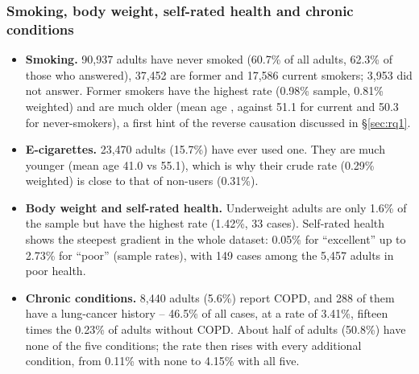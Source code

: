 \subsubsection{Smoking, body weight, self-rated health and chronic conditions}\label{sec:smokingprofile}

\begin{table}[htbp]
\centering\footnotesize
\caption{Smoking, e-cigarette use, body weight and self-rated health (same columns as Table~\ref{tab:prof-demo}).}\label{tab:prof-smoking}

\end{table}

\begin{table}[htbp]
\centering\footnotesize
\caption{Chronic conditions (ever told by a doctor) and the number of the five conditions (same columns as Table~\ref{tab:prof-demo}).}\label{tab:prof-conditions}

\end{table}

\begin{itemize}
  \item \textbf{Smoking.} 90,937 adults have never smoked (60.7\% of all adults, 62.3\% of those who answered), 37,452 are former and 17,586 current smokers; 3,953 did not answer. Former smokers have the highest rate (0.98\% sample, 0.81\% weighted) and are much older (mean age \formerSmokerAge, against 51.1 for current and 50.3 for never-smokers), a first hint of the reverse causation discussed in \S\ref{sec:rq1}.
  \item \textbf{E-cigarettes.} 23,470 adults (15.7\%) have ever used one. They are much younger (mean age 41.0 vs 55.1), which is why their crude rate (0.29\% weighted) is close to that of non-users (0.31\%).
  \item \textbf{Body weight and self-rated health.} Underweight adults are only 1.6\% of the sample but have the highest rate (1.42\%, 33 cases). Self-rated health shows the steepest gradient in the whole dataset: 0.05\% for ``excellent'' up to 2.73\% for ``poor'' (sample rates), with 149 cases among the 5,457 adults in poor health.
  \item \textbf{Chronic conditions.} 8,440 adults (5.6\%) report COPD, and 288 of them have a lung-cancer history -- 46.5\% of all cases, at a rate of 3.41\%, fifteen times the 0.23\% of adults without COPD. About half of adults (50.8\%) have none of the five conditions; the rate then rises with every additional condition, from 0.11\% with none to 4.15\% with all five.
\end{itemize}

